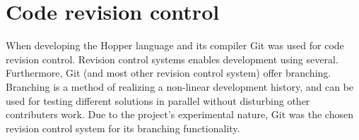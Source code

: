 \section{Code revision control}

When developing the Hopper language and its compiler Git was used for code revision control.
Revision control systems enables development using several. Furthermore, Git (and most other
revision control system) offer branching. Branching is a method of realizing a non-linear
development history, and can be used for testing different solutions in parallel without
disturbing other contributers work. Due to the project's experimental nature, Git was the
chosen revision control system for its branching functionality.
